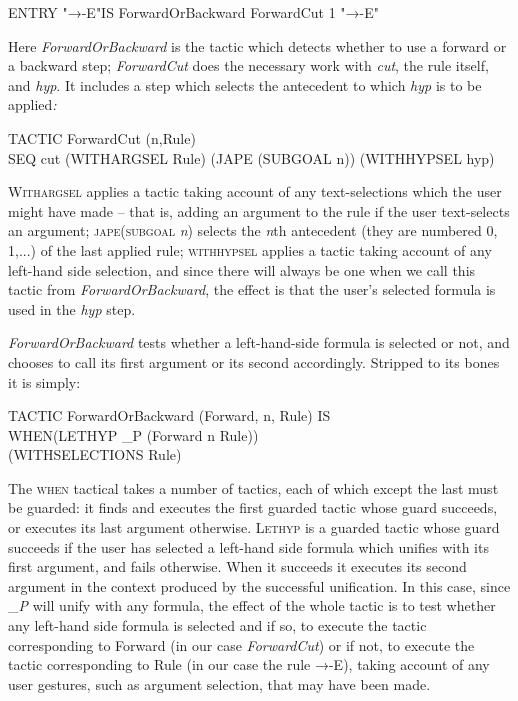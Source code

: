 \documentclass[11pt]{book}
\newcommand{\tab}{\hspace{5mm}}
\begin{document}
ENTRY "→-E"\tab IS ForwardOrBackward ForwardCut 1 "→-E"


Here \textit{ForwardOrBackward} is the tactic which detects whether to use a forward or a backward step; \textit{ForwardCut} does the necessary work with \textit{cut}, the rule itself, and \textit{hyp}. It includes a step which selects the antecedent to which \textit{hyp} is to be applied\textit{:}

TACTIC ForwardCut (n,Rule) \\
SEQ cut (WITHARGSEL Rule) (JAPE (SUBGOAL n)) (WITHHYPSEL hyp)


\textsc{Withargsel} applies a tactic taking account of any text-selections which the user might have made -- that is, adding an argument to the rule if the user text-selects an argument; \textsc{jape(subgoal} \textit{n}\textsc{)} selects the \textit{n}th antecedent (they are numbered 0, 1,...) of the last applied rule; \textsc{withhypsel} applies a tactic taking account of any left-hand side selection, and since there will always be one when we call this tactic from \textit{ForwardOrBackward}, the effect is that the user's selected formula is used in the \textit{hyp} step.


\textit{ForwardOrBackward} tests whether a left-hand-side formula is selected or not, and chooses to call its first argument or its second accordingly. Stripped to its bones it is simply:

TACTIC ForwardOrBackward (Forward, n, Rule) IS \\
\tab WHEN\tab (LETHYP \_P (Forward n Rule))\\
\tab \tab (WITHSELECTIONS Rule)


The \textsc{when} tactical takes a number of tactics, each of which except the last must be guarded: it finds and executes the first guarded tactic whose guard succeeds, or executes its last argument otherwise. \textsc{Lethyp} is a guarded tactic whose guard succeeds if the user has selected a left-hand side formula which unifies with its first argument, and fails otherwise. When it succeeds it executes its second argument in the context produced by the successful unification. In this case, since \_\textit{P} will unify with any formula, the effect of the whole tactic is to test whether any left-hand side formula is selected and if so, to execute the tactic corresponding to Forward (in our case \textit{ForwardCut}) or if not, to execute the tactic corresponding to Rule (in our case the rule →-E), taking account of any user gestures, such as argument selection, that may have been made.
\end{document}
